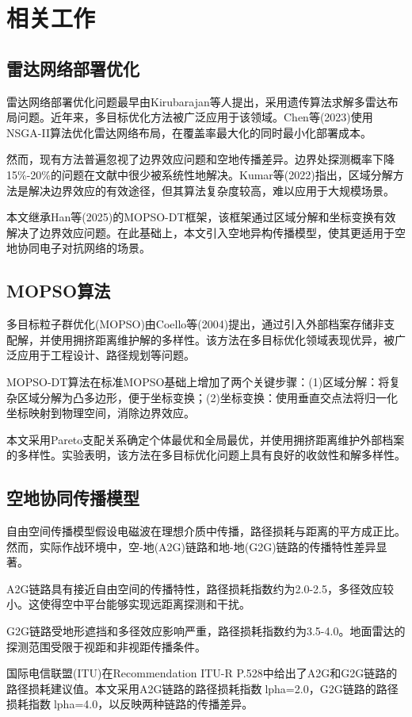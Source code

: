 \section{相关工作}
\label{sec:related}

\subsection{雷达网络部署优化}

雷达网络部署优化问题最早由Kirubarajan等人提出，采用遗传算法求解多雷达布局问题。近年来，多目标优化方法被广泛应用于该领域。Chen等(2023)使用NSGA-II算法优化雷达网络布局，在覆盖率最大化的同时最小化部署成本。

然而，现有方法普遍忽视了边界效应问题和空地传播差异。边界处探测概率下降15\%-20\%的问题在文献中很少被系统性地解决。Kumar等(2022)指出，区域分解方法是解决边界效应的有效途径，但其算法复杂度较高，难以应用于大规模场景。

本文继承Han等(2025)的MOPSO-DT框架，该框架通过区域分解和坐标变换有效解决了边界效应问题。在此基础上，本文引入空地异构传播模型，使其更适用于空地协同电子对抗网络的场景。

\subsection{MOPSO算法}

多目标粒子群优化(MOPSO)由Coello等(2004)提出，通过引入外部档案存储非支配解，并使用拥挤距离维护解的多样性。该方法在多目标优化领域表现优异，被广泛应用于工程设计、路径规划等问题。

MOPSO-DT算法在标准MOPSO基础上增加了两个关键步骤：(1)区域分解：将复杂区域分解为凸多边形，便于坐标变换；(2)坐标变换：使用垂直交点法将归一化坐标映射到物理空间，消除边界效应。

本文采用Pareto支配关系确定个体最优和全局最优，并使用拥挤距离维护外部档案的多样性。实验表明，该方法在多目标优化问题上具有良好的收敛性和解多样性。

\subsection{空地协同传播模型}

自由空间传播模型假设电磁波在理想介质中传播，路径损耗与距离的平方成正比。然而，实际作战环境中，空-地(A2G)链路和地-地(G2G)链路的传播特性差异显著。

A2G链路具有接近自由空间的传播特性，路径损耗指数约为2.0-2.5，多径效应较小。这使得空中平台能够实现远距离探测和干扰。

G2G链路受地形遮挡和多径效应影响严重，路径损耗指数约为3.5-4.0。地面雷达的探测范围受限于视距和非视距传播条件。

国际电信联盟(ITU)在Recommendation ITU-R P.528中给出了A2G和G2G链路的路径损耗建议值。本文采用A2G链路的路径损耗指数lpha=2.0，G2G链路的路径损耗指数lpha=4.0，以反映两种链路的传播差异。